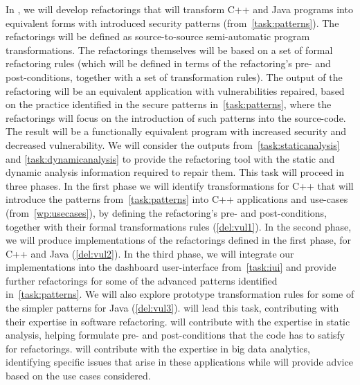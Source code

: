\begin{Workpackage}{\thewpno}
\begin{Task}
In \theTask{}, we will develop refactorings that will transform C++ and Java programs into equivalent forms with introduced security patterns (from~\ref{task:patterns}). The refactorings will be defined as source-to-source semi-automatic program transformations. 
%
%
%
The refactorings themselves will be based on a set of formal refactoring rules (which will be defined in terms of the refactoring's pre- and post-conditions, together with a set of transformation rules). The output of the refactoring will be an equivalent application with vulnerabilities repaired, based on the practice identified in the secure patterns in~\ref{task:patterns}, where the refactorings will focus on the introduction of such patterns into the source-code. The result will be a functionally equivalent program with increased security and decreased vulnerability. %
We will consider the outputs from~\ref{task:staticanalysis} and \ref{task:dynamicanalysis} to provide the refactoring tool with the static and dynamic analysis information required to repair them.
%
%
This task will proceed in three phases. In the first phase we will identify transformations for C++  that will introduce the patterns from~\ref{task:patterns} into C++ applications and use-cases (from~\ref{wp:usecases}), by defining the refactoring's  pre- and post-conditions, together with their formal transformations rules (\ref{del:vul1}). In the second phase, we will produce implementations of the refactorings defined in the first phase, for C++ and Java (\ref{del:vul2}).
 In the third phase, we will integrate our implementations into the dashboard user-interface from~\ref{task:iui} and provide further refactorings for some of the advanced patterns identified in~\ref{task:patterns}.
We will also explore prototype transformation rules for some of the simpler patterns for Java (\ref{del:vul3}). \SAshort{} will lead this task, contributing with their expertise in software refactoring. \YAGshort{} will contribute with the expertise in static analysis, helping formulate pre- and post-conditions that the code has to satisfy for refactorings. \UODshort{} will contribute with the expertise in big data analytics, identifying specific issues that arise in these applications while \SOPRAshort{} will provide advice based on the use cases considered.


\end{Task}
\end{Workpackage}
